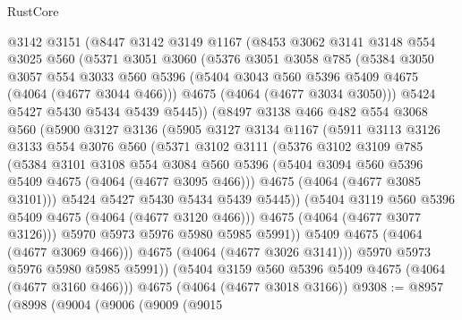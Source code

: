 \begin{lexlean}{RustCore}
\begin{coremodule}
      @3142
      @3151
      (@8447
        @3142
        @3149
        @1167
        (@8453
          @3062
          @3141
          @3148
          @554
          @3025
          @560
          (@5371
            @3051
            @3060
            (@5376
              @3051
              @3058
              @785
              (@5384
                @3050
                @3057
                @554
                @3033
                @560
                @5396
                (@5404 @3043 @560 @5396 @5409 @4675 (@4064 (@4677 @3044 @466)))
                @4675
                (@4064 (@4677 @3034 @3050)))
              @5424
              @5427
              @5430
              @5434
              @5439
              @5445))
          (@8497
            @3138
            @466
            @482
            @554
            @3068
            @560
            (@5900
              @3127
              @3136
              (@5905
                @3127
                @3134
                @1167
                (@5911
                  @3113
                  @3126
                  @3133
                  @554
                  @3076
                  @560
                  (@5371
                    @3102
                    @3111
                    (@5376
                      @3102
                      @3109
                      @785
                      (@5384
                        @3101
                        @3108
                        @554
                        @3084
                        @560
                        @5396
                        (@5404 @3094 @560 @5396 @5409 @4675 (@4064 (@4677 @3095 @466)))
                        @4675
                        (@4064 (@4677 @3085 @3101)))
                      @5424
                      @5427
                      @5430
                      @5434
                      @5439
                      @5445))
                  (@5404 @3119 @560 @5396 @5409 @4675 (@4064 (@4677 @3120 @466)))
                  @4675
                  (@4064 (@4677 @3077 @3126)))
                @5970
                @5973
                @5976
                @5980
                @5985
                @5991))
            @5409
            @4675
            (@4064 (@4677 @3069 @466)))
          @4675
          (@4064 (@4677 @3026 @3141)))
        @5970
        @5973
        @5976
        @5980
        @5985
        @5991))
    (@5404 @3159 @560 @5396 @5409 @4675 (@4064 (@4677 @3160 @466)))
    @4675
    (@4064 (@4677 @3018 @3166))
@9308 := @8957
    (@8998
      (@9004
        (@9006
          (@9009
            (@9015

\end{coremodule}
\end{lexlean}

